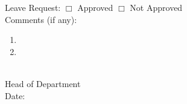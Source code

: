 \documentclass[11pt,a4paper]{article}
\begin{document}
\noindent
Leave Request: \hspace{2em} $\Box$ Approved \hspace{2em} $\Box$ Not Approved\\[2em]

\noindent
Comments (if any): 
\begin{enumerate}[leftmargin=1.5em]
    \item \hrulefill
    \item \hrulefill
    
\end{enumerate}
\begin{flushright}
    \underline{\hspace{5cm}}\\
    Head of Department\\[1em]
    Date: \underline{\hspace{4cm}}
\end{flushright}
\end{document}
